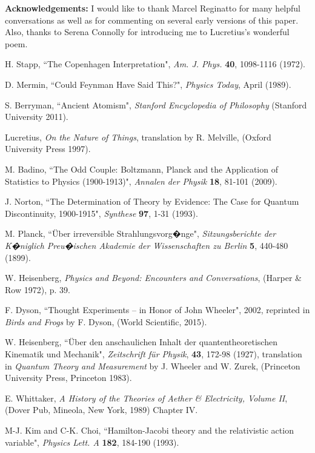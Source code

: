 \documentclass[12pt]{article}
\begin{document}
\textbf{Acknowledgements:}
I would like to thank Marcel Reginatto for many helpful conversations as well as for commenting on several early versions of this paper.  Also, thanks to Serena Connolly for introducing me to Lucretius's wonderful poem.

\begin{thebibliography}{99}

 H. Stapp, ``The Copenhagen Interpretation", {\it Am. J. Phys.} \textbf{40}, 1098-1116 (1972).

 D.  Mermin, ``Could Feynman Have Said This?", {\it Physics Today}, April (1989).  

 S. Berryman, ``Ancient Atomism", {\it Stanford Encyclopedia of Philosophy} (Stanford University 2011).

 Lucretius, {\it On the Nature of Things}, translation by R. Melville, (Oxford University Press 1997). 

 M. Badino, ``The Odd Couple: Boltzmann, Planck and the Application of Statistics to Physics (1900-1913)", {\it Annalen der Physik} \textbf{18}, 81-101 (2009).

 J. Norton, ``The Determination of Theory by Evidence: The Case for Quantum Discontinuity, 1900-1915", {\it Synthese} \textbf{97}, 1-31 (1993).

 M. Planck, ``\"Uber irreversible Strahlungsvorg�nge", {\it Sitzungsberichte der K�niglich Preu�ischen Akademie der Wissenschaften zu Berlin} \textbf{5}, 440-480 (1899).

 W. Heisenberg, {\it Physics and Beyond: Encounters and Conversations}, (Harper \& Row 1972), p. 39.

 F. Dyson, ``Thought Experiments -- in Honor of John Wheeler", 2002, reprinted in {\it Birds and Frogs} by F. Dyson, (World Scientific, 2015).

 W. Heisenberg, ``\"{U}ber den anschaulichen Inhalt der quantentheoretischen Kinematik und Mechanik", {\it Zeitschrift f\"{u}r Physik}, \textbf{43}, 172-98 (1927), translation in {\it Quantum Theory and Measurement} by J. Wheeler and W. Zurek, (Princeton University Press, Princeton 1983).

 E. Whittaker, {\it A History of the Theories of Aether \& Electricity, Volume II}, (Dover Pub, Mineola, New York, 1989) Chapter IV.

 M-J. Kim and C-K. Choi, ``Hamilton-Jacobi theory and the relativistic action variable", {\it Physics Lett. A} \textbf{182}, 184-190 (1993).


\end{thebibliography}
\end{document}
